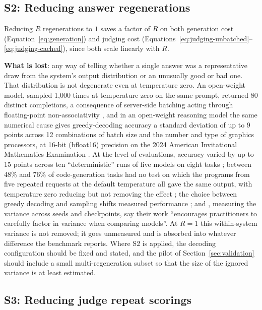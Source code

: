 \documentclass[11pt]{article}
\begin{document}
\subsection{S2: Reducing answer regenerations}

Reducing $R$ regenerations to $1$ saves a factor of $R$ on both generation cost (Equation~\ref{eq:generation}) and judging cost (Equations~\ref{eq:judging-unbatched}--\ref{eq:judging-cached}), since both scale linearly with $R$.

\textbf{What is lost}: any way of telling whether a single answer was a representative draw from the system's output distribution or an unusually good or bad one. That distribution is not degenerate even at temperature zero. An open-weight model, sampled 1{,}000 times at temperature zero on the same prompt, returned 80 distinct completions, a consequence of server-side batching acting through floating-point non-associativity \citep{thinkingmachines2025}, and in an open-weight reasoning model the same numerical cause gives greedy-decoding accuracy a standard deviation of up to 9 points across 12 combinations of batch size and the number and type of graphics processors, at 16-bit (bfloat16) precision on the 2024 American Invitational Mathematics Examination \citep{yuan2025nondeterminism}. At the level of evaluations, accuracy varied by up to 15 points across ten ``deterministic'' runs of five models on eight tasks \citep{atil2024nondeterminism}; between 48\% and 76\% of code-generation tasks had no test on which the programs from five repeated requests at the default temperature all gave the same output, with temperature zero reducing but not removing the effect \citep{ouyang2023nondeterminism}; the choice between greedy decoding and sampling shifts measured performance \citep{song2024greedy}; and \citet{madaan2024variance}, measuring the variance across seeds and checkpoints, say their work ``encourages practitioners to carefully factor in variance when comparing models''. At $R = 1$ this within-system variance is not removed; it goes unmeasured and is absorbed into whatever difference the benchmark reports. Where S2 is applied, the decoding configuration should be fixed and stated, and the pilot of Section~\ref{sec:validation} should include a small multi-regeneration subset so that the size of the ignored variance is at least estimated.

\subsection{S3: Reducing judge repeat scorings}
\end{document}
